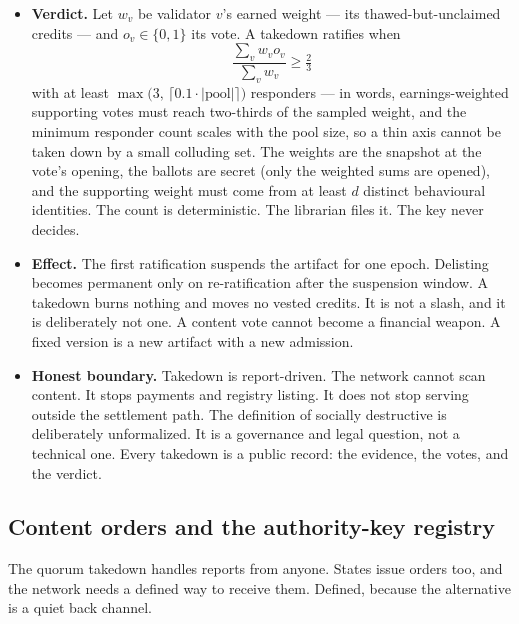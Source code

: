\documentclass[11pt]{article}
\begin{document}
\begin{itemize}
claim.
\item \textbf{Verdict.} Let $w_v$ be validator $v$'s earned
weight --- its thawed-but-unclaimed credits --- and
$o_v \in \{0, 1\}$ its vote. A takedown ratifies when
\begin{equation}
\frac{\sum_v w_v o_v}{\sum_v w_v} \geq \tfrac{2}{3}
\end{equation}
with at least
$\max\bigl(3,\, \lceil 0.1 \cdot |\text{pool}|\rceil\bigr)$
responders --- in words, earnings-weighted
supporting votes must reach two-thirds of the sampled weight,
and the minimum responder count scales with the pool size, so a
thin axis cannot be taken down by a small colluding set. The
weights are the snapshot at the vote's
opening, the ballots are secret (only the weighted sums are
opened), and the supporting weight must come from at least $d$
distinct behavioural identities. The count is deterministic. The
librarian files it. The key never decides.
\item \textbf{Effect.} The first ratification suspends the
artifact for one epoch. Delisting becomes permanent only on
re-ratification after the suspension window. A takedown
burns nothing and moves no vested credits. It is not a slash, and
it is deliberately not one. A content vote cannot become a
financial weapon. A fixed version is a new artifact with a new
admission.
\item \textbf{Honest boundary.} Takedown is report-driven. The
network cannot scan content. It stops payments and registry
listing. It does not stop serving outside the settlement path.
The definition of socially destructive is deliberately
unformalized. It is a governance and legal question, not a
technical one. Every takedown is a public record: the evidence,
the votes, and the verdict.
\end{itemize}

\subsection{Content orders and the authority-key registry}

The quorum takedown handles reports from anyone. States issue
orders too, and the network needs a defined way to receive them.
Defined, because the alternative is a quiet back channel.
\end{document}
